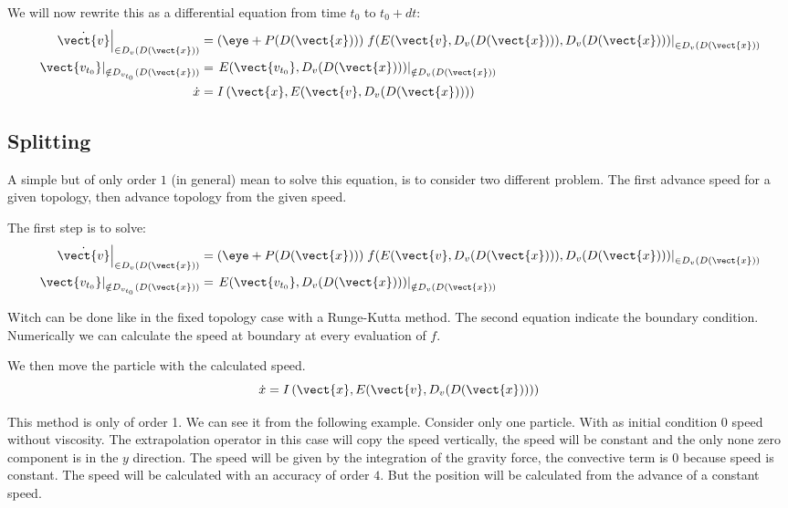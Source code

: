 We will now rewrite this as a differential equation from time $t_0$ to $t_0+dt$:
\begin{align*}
	\left.\dot{\vect{v}}\right|_{\in D_{v}(D(\vect{x}))}&=\left(\eye+P(D(\vect{x}))\right)\left.f(E(\vect{v},D_v(D(\vect{x}))),D_{v}(D(\vect{x})))\right|_{\in D_{v}(D(\vect{x}))}\\
	\left.\vect{v_{t_0}}\right|_{\notin D_{v_{t_0}}(D(\vect{x}))}&=\left.E(\vect{v_{t_0}},D_v(D(\vect{x})))\right|_{\notin D_{v}(D(\vect{x}))}\\
	\dot{x}&=I\left(\vect{x},E(\vect{v},D_v(D(\vect{x})))\right)\\
\end{align*}

\subsection{Splitting}

A simple but of only order $1$ (in general) mean to solve this equation, is to consider two different problem.
The first advance speed for a given topology, then advance topology from the given speed.

The first step is to solve:
\begin{align}
\left.\dot{\vect{v}}\right|_{\in D_{v}(D(\vect{x}))}&=\left(\eye+P(D(\vect{x}))\right)\left.f(E(\vect{v},D_v(D(\vect{x}))),D_{v}(D(\vect{x})))\right|_{\in D_{v}(D(\vect{x}))}\\
	\left.\vect{v_{t_0}}\right|_{\notin D_{v_{t_0}}(D(\vect{x}))}&=\left.E(\vect{v_{t_0}},D_v(D(\vect{x})))\right|_{\notin D_{v}(D(\vect{x}))}
\end{align}

Witch can be done like in the fixed topology case with a Runge-Kutta method. The second equation indicate the boundary condition.
Numerically we can calculate the speed at boundary at every evaluation of $f$.

We then move the particle with the calculated speed.
\begin{equation}
	\dot{x}=I\left(\vect{x},E(\vect{v},D_v(D(\vect{x})))\right)\\
\end{equation}

This method is only of order 1. We can see it from the following example.
Consider only one particle. With as initial condition 0 speed without viscosity.
The extrapolation operator in this case will copy the speed vertically,
the speed will be constant and the only none zero component is in the $y$ direction.
The speed will be given by the integration of the gravity force, the convective term is 0 because speed is constant.
The speed will be calculated with an accuracy of order $4$.
But the position will be calculated from the advance of a constant speed.

